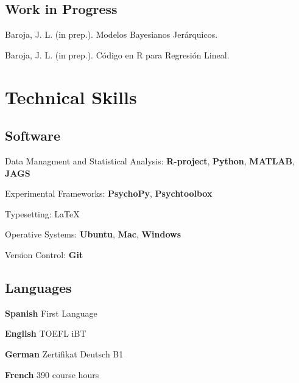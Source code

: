 \documentclass[letterpaper]{article}
\renewenvironment{itemize}{
  \begin{list}{}{
    \setlength{\leftmargin}{1.5em}
  }
}{
  \end{list}
}
\begin{document}
\subsection*{Work in Progress}
\begin{itemize}
\setlength\itemsep{-.25em}
\setlength{\itemindent}{-.125in}
	\item Baroja, J. L. (in prep.). Modelos Bayesianos Jerárquicos.
	\item Baroja, J. L. (in prep.). Código en R para Regresión Lineal.
\end{itemize}





\section*{Technical Skills}

\subsection*{Software}
\begin{itemize}
\setlength\itemsep{-.25em}
\setlength{\itemindent}{-.125in}
	\item Data Managment and Statistical Analysis: {\bf R-project}, {\bf Python}, {\bf MATLAB}, {\bf JAGS}
	\item Experimental Frameworks: {\bf PsychoPy}, {\bf Psychtoolbox}
	\item Typesetting: \LaTeX
	\item Operative Systems: {\bf Ubuntu}, {\bf Mac}, {\bf Windows}
	\item Version Control: {\bf Git}
\end{itemize}

\subsection*{Languages}
\begin{itemize}
\setlength\itemsep{-.25em}
\setlength{\itemindent}{-.125in}
	\item{\bf Spanish} First Language
	\item{\bf English} TOEFL iBT
	\item{\bf German} Zertifikat Deutsch B1
	\item{\bf French} 390 course hours
\end{itemize}
\end{document}
